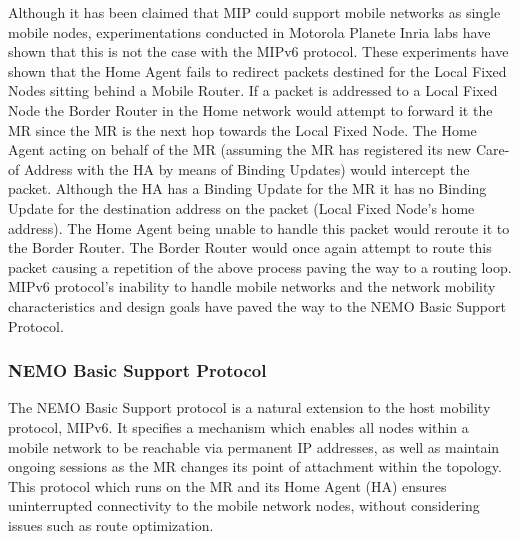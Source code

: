 Although it has been claimed that MIP could support mobile networks as
single mobile nodes, experimentations conducted in Motorola Planete
Inria labs \cite{12} have shown that this is not the case with the MIPv6
protocol. These experiments have shown that the Home Agent fails to redirect
packets destined for the Local Fixed Nodes sitting behind a Mobile Router. If
a packet is addressed to a Local Fixed Node the Border Router in the Home
network would attempt to forward it the MR since the MR is the next hop
towards the Local Fixed Node. The Home Agent acting on behalf of the MR
(assuming the MR has registered its new Care-of Address with the HA by means
of Binding Updates) would intercept the packet. Although the HA has a Binding
Update for the MR it has no Binding Update for the destination address on the
packet (Local Fixed Node's home address). The Home Agent being unable to
handle this packet would reroute it to the Border Router. The Border Router
would once again attempt to route this packet causing a repetition of the
above process paving the way to a routing loop. MIPv6 protocol's inability to
handle mobile networks and the network mobility characteristics and design
goals have paved the way to the NEMO Basic Support Protocol.

\subsubsection{NEMO Basic Support Protocol}

The NEMO Basic Support protocol is a natural extension to the host mobility
protocol, MIPv6. It specifies a mechanism which enables all nodes within a mobile
network to be reachable via permanent IP addresses, as well as maintain
ongoing sessions as the MR changes its point of attachment within the
topology. This protocol which runs on the MR and its Home Agent (HA) ensures
uninterrupted connectivity to the mobile network nodes, without considering
issues such as route optimization.

